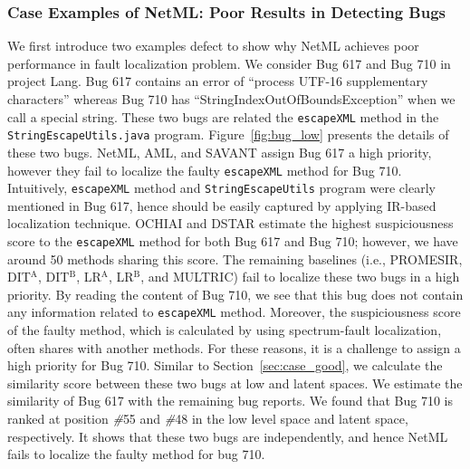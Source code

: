 \subsubsection{Case Examples of NetML: Poor Results in Detecting Bugs}
\label{sec:case_bad}
We first introduce two examples defect to show why NetML achieves poor performance in fault localization problem. We consider Bug 617 and Bug 710 in project Lang. Bug 617 contains an error of ``process UTF-16 supplementary characters'' whereas Bug 710 has ``StringIndexOutOfBoundsException'' when we call a special string. These two bugs are related the \texttt{escapeXML} method in the \texttt{StringEscapeUtils.java} program. Figure~\ref{fig:bug_low} presents the details of these two bugs. NetML, AML, and SAVANT assign Bug 617 a high priority, however they fail to localize the faulty \texttt{escapeXML} method for Bug 710. Intuitively, \texttt{escapeXML} method and \texttt{StringEscapeUtils} program were clearly mentioned in Bug 617, hence should be easily captured by applying IR-based localization technique. OCHIAI and DSTAR estimate the highest suspiciousness score to the \texttt{escapeXML} method for both Bug 617 and Bug 710; however, we have around 50 methods sharing this score. The remaining baselines (i.e., PROMESIR, DIT$^\text{A}$, DIT$^\text{B}$, LR$^\text{A}$, LR$^\text{B}$, and MULTRIC) fail to localize these two bugs in a high priority. By reading the content of Bug 710, we see that this bug does not contain any information related to \texttt{escapeXML} method. Moreover, the suspiciousness score of the faulty method, which is calculated by using spectrum-fault localization, often shares with another methods. For these reasons, it is a challenge to assign a high priority for Bug 710. Similar to Section~\ref{sec:case_good}, we calculate the similarity score between these two bugs at low and latent spaces. We estimate the similarity of Bug 617 with the remaining bug reports. We found that Bug 710 is ranked at position \textit{\#}55 and \textit{\#}48 in the low level space and latent space, respectively. It shows that these two bugs are independently, and hence NetML fails to localize the faulty method for bug 710.

